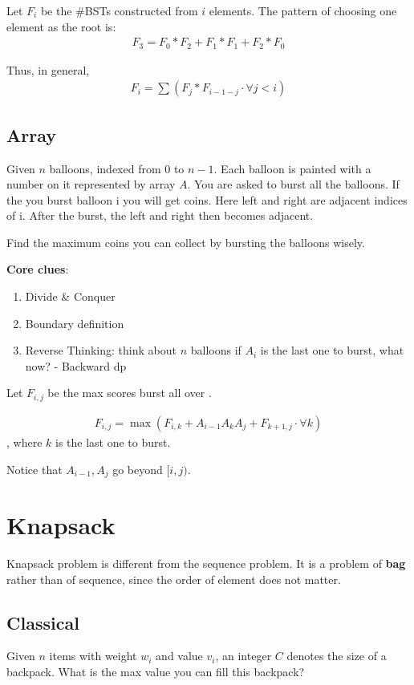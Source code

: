 Let $F_i$ be the \#BSTs constructed from $i$ elements. The pattern of choosing one element as the root is: 
\begin{align*}
F_3 = F_0*F_2 + F_1*F_1 + F_2*F_0
\end{align*}

Thus, in general, 
\begin{align*}
F_i = \sum(F_{j}*F_{i-1-j} \cdot \forall j< i)
\end{align*}

\subsection{Array}
 Given $n$ balloons, indexed from 0 to $n-1$. Each balloon is painted with a number on it represented by array $A$. You are asked to burst all the balloons. If the you burst balloon i you will get  coins. Here left and right are adjacent indices of i. After the burst, the left and right then becomes adjacent.

Find the maximum coins you can collect by bursting the balloons wisely.

\textbf{Core clues}:
\begin{enumerate}
\item Divide \& Conquer
\item Boundary definition
\item Reverse Thinking: think about $n$ balloons if $A_i$ is the last one to burst, what now? - Backward dp
\end{enumerate}
Let $F_{i, j}$ be the max scores burst all over .

\begin{align*}
F_{i, j} = \max(F_{i,k} + A_{i-1}  A_k A_j + F_{k+1, j} \cdot \forall k)
\end{align*}
, where $k$ is the last one to burst. 

Notice that $A_{i-1}, A_{j}$ go beyond $[i, j)$.

\section{Knapsack}
Knapsack problem is different from the sequence problem. It is a problem of \textbf{bag} rather than of sequence, since the order of element does not matter. 

\subsection{Classical}
Given $n$ items with weight $w_i$ and value $v_i$, an integer $C$ denotes the size of a backpack. What is the max value you can fill this backpack?

